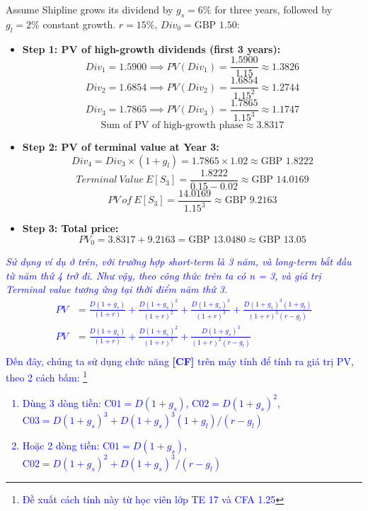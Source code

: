 \begin{tcolorbox}[
	colback=gray!5!white,
	colframe=black!15!white,
	boxrule=0.5pt,
	arc=3pt,
	title=\textbf{Example: Shipline PLC Two-Stage Dividend Growth Valuation},
	coltitle=black,
	colbacktitle=black!5!white,
	before skip=6pt,
	after skip=6pt,
	breakable
]
Assume Shipline grows its dividend by $g_s = 6\%$ for three years, followed by $g_l = 2\%$ constant growth. $r = 15\%$, $Div_0 = \text{GBP } 1.50$:
\begin{itemize}
	\item \textbf{Step 1: PV of high-growth dividends (first 3 years):}
	      \[ Div_1 = 1.5900 \implies PV(Div_1) = \frac{1.5900}{1.15} \approx 1.3826 \]
	      \[ Div_2 = 1.6854 \implies PV(Div_2) = \frac{1.6854}{1.15^2} \approx 1.2744 \]
	      \[ Div_3 = 1.7865 \implies PV(Div_3) = \frac{1.7865}{1.15^3} \approx 1.1747 \]
	      \[ \text{Sum of PV of high-growth phase} \approx 3.8317 \]
	\item \textbf{Step 2: PV of terminal value at Year 3:}
	      \[ Div_4 = Div_3 \times (1 + g_l) = 1.7865 \times 1.02 \approx \text{GBP } 1.8222 \]
	      \[ Terminal\ Value\ E[S_3] = \frac{1.8222}{0.15 - 0.02} \approx \text{GBP } 14.0169 \]
	      \[ PV\ of\ E[S_3] = \frac{14.0169}{1.15^3} \approx \text{GBP } 9.2163 \]
	\item \textbf{Step 3: Total price:}
	      \[ PV_0 = 3.8317 + 9.2163 = \text{GBP } 13.0480 \approx \text{GBP } 13.05 \]
\end{itemize}
\textcolor{blue}{
		      \textit{Sử dụng ví dụ ở trên, với trường hợp short-term là 3 năm, và long-term bắt đầu từ năm thứ 4 trở đi.
			      Như vậy, theo công thức trên ta có n = 3, và giá trị Terminal value tương ứng tại thời điểm năm thứ 3.}
		      \begin{align*}
			      PV & = \frac{D(1+g_s)}{(1+r)} + \frac{D(1+g_s)^2}{(1+r)^2} + \frac{D(1+g_s)^3}{(1+r)^3} + \frac{D(1+g_s)^3(1+g_l)}{(1+r)^3(r-g_l)} \\
			      PV & = \frac{D(1+g_s)}{(1+r)} + \frac{D(1+g_s)^2}{(1+r)^2} + \frac{D(1+g_s)^3}{(1+r)^2(r-g_l)}                                       \\
		      \end{align*}
		      Đến đây, chúng ta sử dụng chức năng \textbf{[CF]} trên máy tính để tính ra giá trị PV, theo 2 cách bấm:
		      \footnote{\label{footnote1}\textcolor{blue}{Đề xuất cách tính này từ học viên lớp TE 17 và CFA 1.25}}
		      \begin{enumerate}
			      \item Dùng 3 dòng tiền: $\text{C01} = D(1+g_s)$, $\text{C02} = D(1+g_s)^2$, $\text{C03} = D(1+g_s)^3 + D(1+g_s)^3(1+g_l)/(r-g_l)$
			      \item Hoặc 2 dòng tiền: $\text{C01} = D(1+g_s)$, $\text{C02} = D(1+g_s)^2 + D(1+g_s)^3/(r-g_l)$
		      \end{enumerate}
	      }
\end{tcolorbox}

